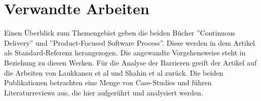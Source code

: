 \section{Verwandte Arbeiten}
Einen Überblick zum Themengebiet geben die beiden Bücher ''Continuous Delivery''\cite{Wolff.2016} und ''Product-Focused Software Process''\cite{Jedlitschka.2014}. Diese werden in dem Artikel als Standard-Referenz herangezogen. Die angewandte Vorgehensweise steht in Beziehung zu diesen Werken. Für die Analyse der Barrieren greift der Artikel auf die Arbeiten von Laukkanen et al\cite{Laukkanen.2017} und Shahin et al\cite{Shahin.2017} zurück. Die beiden Publikationen betrachten eine Menge von Case-Studies und führen Literaturreviews aus, die hier aufgerührt und analysiert werden.

 


  